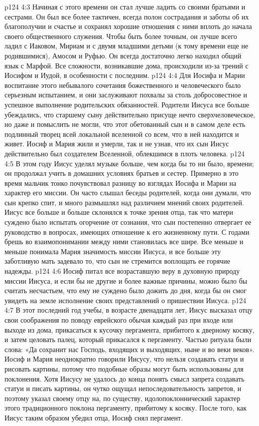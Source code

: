 \vs p124 4:3 Начиная с этого времени он стал лучше ладить со своими братьями и сестрами. Он был все более тактичен, всегда полон сострадания и заботы об их благополучии и счастье и сохранял хорошие отношения с ними вплоть до начала своего общественного служения. Чтобы быть более точным, он лучше всего ладил с Иаковом, Мириам и с двумя младшими детьми (к тому времени еще не родившимися), Амосом и Руфью. Он всегда достаточно легко находил общий язык с Марфой. Все сложности, возникавшие дома, происходили из\hyp{}за трений с Иосифом и Иудой, в особенности с последним.
\vs p124 4:4 \pc Для Иосифа и Марии воспитание этого небывалого сочетания божественного и человеческого было серьезным испытанием, и они заслуживают похвалы за столь добросовестное и успешное выполнение родительских обязанностей. Родители Иисуса все больше убеждались, что старшему сыну действительно присуще нечто сверхчеловеческое, но даже и помыслить не могли, что этот обетованный сын и в самом деле есть подлинный творец всей локальной вселенной со всем, что в ней находится и живет. Иосиф и Мария жили и умерли, так и не узнав, что их сын Иисус действительно был создателем Вселенной, облекшимся в плоть человека.
\vs p124 4:5 В этом году Иисус уделял музыке больше, чем когда бы то ни было, времени; он продолжал учить в домашних условиях братьев и сестер. Примерно в это время мальчик тонко почувствовал разницу во взглядах Иосифа и Марии на характер его миссии. Он часто слышал беседы родителей, когда они думали, что сын крепко спит, и много размышлял над различием мнений своих родителей. Иисус все больше и больше склонялся к точке зрения отца, так что матери суждено было испытать огорчение от сознания, что сын постепенно отвергает ее руководство в вопросах, имеющих отношение к его жизненному пути. С годами брешь во взаимопонимании между ними становилась все шире. Все меньше и меньше понимала Мария значимость миссии Иисуса, и все больше эту заботливую мать задевало то, что сын не стремится воплощать ее горячие надежды.
\vs p124 4:6 Иосиф питал все возраставшую веру в духовную природу миссии Иисуса, и если бы не другие и более важные причины, можно было бы считать несчастьем, что ему не суждено было дожить до дня, когда бы он смог увидеть на земле исполнение своих представлений о пришествии Иисуса.
\vs p124 4:7 \pc В этот последний год учебы, в возрасте двенадцати лет, Иисус высказал отцу свои соображения по поводу еврейского обычая каждый раз при входе или выходе из дома, прикасаться к кусочку пергамента, прибитого к дверному косяку, и затем целовать палец, который прикасался к пергаменту. Частью ритуала были слова: «Да сохранит нас Господь, входящих и выходящих, ныне и во веки веков». Иосиф и Мария неоднократно говорили Иисусу, что нельзя создавать статуи и рисовать картины, потому что подобные образы могут быть использованы для поклонения. Хотя Иисусу не удалось до конца понять смысл запрета создавать статуи и писать картины, он чутко ощущал непоследовательность запретов, и поэтому указал своему отцу на, по существу, идолопоклоннический характер этого традиционного поклона пергаменту, прибитому к косяку. После того, как Иисус таким образом убедил отца, Иосиф снял пергамент.
